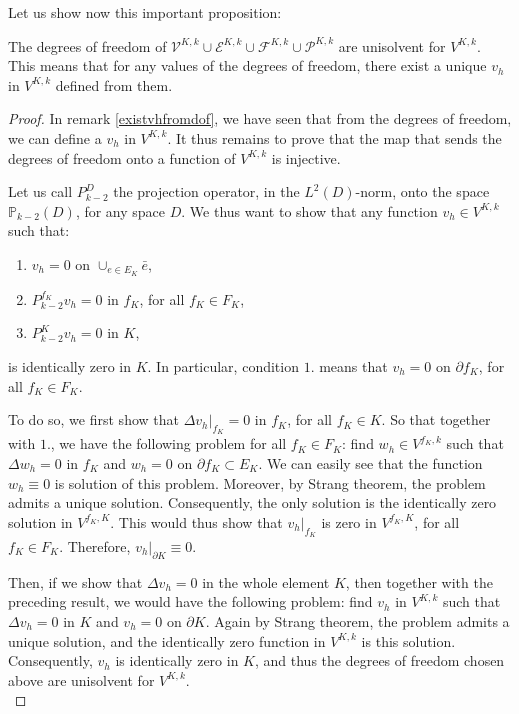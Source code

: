 Let us show now this important proposition:
\begin{proposition}
The degrees of freedom of $\mathcal{V}^{K,k}\cup\mathcal{E}^{K,k}\cup \mathcal{F}^{K,k}\cup\mathcal{P}^{K,k}$ are unisolvent for $V^{K,k}$. This means that for any values of the degrees of freedom, there exist a unique $v_h$ in $V^{K,k}$ defined from them. 
\end{proposition}
\begin{proof}
In remark \ref{existvhfromdof}, we have seen that from the degrees of freedom, we can define a $v_h$ in $V^{K,k}$. It thus remains to prove that the map that sends the degrees of freedom onto a function of $V^{K,k}$ is injective. 

Let us call $P_{k-2}^D$ the projection operator, in the $L^2(D)$-norm, onto the space $\mathbb{P}_{k-2}(D)$, for any space $D$. We thus want to show that any function $v_h\in V^{K,k}$ such that:
\begin{enumerate}
\item $v_h=0$ on $\cup_{e\in E_K} \bar{e}$, 
\item $P_{k-2}^{f_K}v_h = 0$ in $f_K$, for all $f_K\in F_K$,
\item $P_{k-2}^Kv_h = 0$ in $K$,
\end{enumerate}
is identically zero in $K$. In particular, condition $1.$ means that $v_h = 0$ on $\partial f_K$, for all $f_K\in F_K$.

To do so, we first show that $\Delta v_h|_{f_K}=0$ in $f_K$, for all $f_K\in K$. So that together with $1.$, we have the following problem for all $f_K\in F_K$: find $w_h\in V^{f_K,k}$ such that $\Delta w_h = 0$ in $f_K$ and $w_h = 0$ on $\partial f_K\subset E_K$. We can easily see that the function $w_h\equiv 0$ is solution of this problem. Moreover, by Strang theorem, the problem admits a unique solution. Consequently, the only solution is the identically zero solution in $V^{f_K,K}$. This would thus show that $v_h|_{f_K}$ is zero in $V^{f_K,K}$, for all $f_K\in F_K$. Therefore, $v_h|_{\partial K} \equiv 0$. 

Then, if we show that $\Delta v_h = 0$ in the whole element $K$, then together with the preceding result, we would have the following problem: find $v_h$ in $V^{K,k}$ such that $\Delta v_h = 0$ in $K$ and $v_h=0$ on $\partial K$. Again by Strang theorem, the problem admits a unique solution, and the identically zero function in $V^{K,k}$ is this solution. Consequently, $v_h$ is identically zero in $K$, and thus the degrees of freedom chosen above are unisolvent for $V^{K,k}$. \\


\end{proof}
